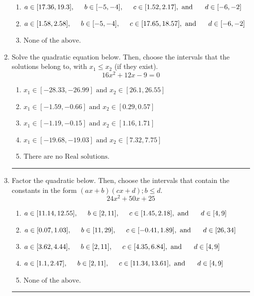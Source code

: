 \documentclass[14pt]{extbook}
\newcommand{\litem}[1]{\item#1\hspace*{-1cm}\rule{\textwidth}{0.4pt}}
\begin{document}
\begin{enumerate}
{\begin{enumerate}[label=\Alph*.]
\item \( a \in [17.36, 19.3], \hspace*{5mm} b \in [-5, -4], \hspace*{5mm} c \in [1.52, 2.17], \text{ and } \hspace*{5mm} d \in [-6, -2] \)
\item \( a \in [1.58, 2.58], \hspace*{5mm} b \in [-5, -4], \hspace*{5mm} c \in [17.65, 18.57], \text{ and } \hspace*{5mm} d \in [-6, -2] \)
\item \( \text{None of the above.} \)

\end{enumerate} }
\litem{
Solve the quadratic equation below. Then, choose the intervals that the solutions belong to, with $x_1 \leq x_2$ (if they exist).\[ 16x^{2} +12 x -9 = 0 \]\begin{enumerate}[label=\Alph*.]
\item \( x_1 \in [-28.33, -26.99] \text{ and } x_2 \in [26.1, 26.55] \)
\item \( x_1 \in [-1.59, -0.66] \text{ and } x_2 \in [0.29, 0.57] \)
\item \( x_1 \in [-1.19, -0.15] \text{ and } x_2 \in [1.16, 1.71] \)
\item \( x_1 \in [-19.68, -19.03] \text{ and } x_2 \in [7.32, 7.75] \)
\item \( \text{There are no Real solutions.} \)

\end{enumerate} }
\litem{
Factor the quadratic below. Then, choose the intervals that contain the constants in the form $(ax+b)(cx+d); b \leq d.$\[ 24x^{2} +50 x + 25 \]\begin{enumerate}[label=\Alph*.]
\item \( a \in [11.14, 12.55], \hspace*{5mm} b \in [2, 11], \hspace*{5mm} c \in [1.45, 2.18], \text{ and } \hspace*{5mm} d \in [4, 9] \)
\item \( a \in [0.07, 1.03], \hspace*{5mm} b \in [11, 29], \hspace*{5mm} c \in [-0.41, 1.89], \text{ and } \hspace*{5mm} d \in [26, 34] \)
\item \( a \in [3.62, 4.44], \hspace*{5mm} b \in [2, 11], \hspace*{5mm} c \in [4.35, 6.84], \text{ and } \hspace*{5mm} d \in [4, 9] \)
\item \( a \in [1.1, 2.47], \hspace*{5mm} b \in [2, 11], \hspace*{5mm} c \in [11.34, 13.61], \text{ and } \hspace*{5mm} d \in [4, 9] \)
\item \( \text{None of the above.} \)

\end{enumerate} }
\end{enumerate}
\end{document}
